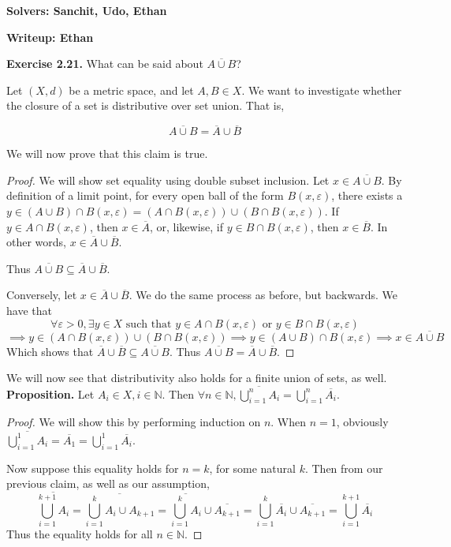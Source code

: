 \documentclass{article}
\newcommand{\cl}[1]{\overline{#1}}
\theoremstyle{plain} %
\numberwithin{thm}{section} %
\theoremstyle{definition}
\begin{document}
	

	
	\noindent\textbf{Solvers: Sanchit, Udo, Ethan}

    \noindent\textbf{Writeup: Ethan}

    \noindent\textbf{Exercise 2.21.} What can be said about $\cl{A\cup B}$?
	
    Let \((X, d)\) be a metric space, and let \(A, B \in X\). We want to investigate whether the closure of a set is distributive over set union. That is,

    \[
        \cl{A\cup B} = \cl{A} \cup \cl{B}
    \]

    We will now prove that this claim is true.

\begin{proof}
	We will show set equality using double subset inclusion. Let \(x \in \cl{A \cup B}\). By definition of a limit point, for every open ball of the form \(B(x, \varepsilon )\), there exists a \(y \in (A \cup B) \cap B(x, \varepsilon ) = (A \cap B(x, \varepsilon )) \cup (B \cap B(x,\varepsilon ))\). If \(y \in A \cap B(x, \varepsilon )\), then \(x \in \cl{A}\), or, likewise, if \(y \in B \cap B(x,\varepsilon )\), then \(x \in \cl{B}\). In other words, \(x \in \cl{A} \cup \cl{B}\).

    Thus \(\cl{A\cup B} \subseteq \cl{A} \cup \cl{B}\).

    \noindent Conversely, let \(x \in \cl{A} \cup \cl{B} \). We do the same process as before, but backwards. We have that
    \[
        \forall \varepsilon > 0, \exists y \in X \text{ such that } y \in A \cap B(x, \varepsilon ) \text{ or } y \in B \cap B(x, \varepsilon )
    \]
    \[
        \implies y \in (A \cap B(x, \varepsilon )) \cup (B \cap B(x, \varepsilon )) \implies y \in (A \cup B) \cap B(x, \varepsilon ) \implies x \in \cl{A \cup B}
    \]
    Which shows that \(\cl{A} \cup \cl{B} \subseteq \cl{A \cup B}\). Thus \(\cl{A\cup B} = \cl{A} \cup \cl{B}\).

\end{proof}
	We will now see that distributivity also holds for a finite union of sets, as well. \\

    \noindent\textbf{Proposition.} Let \(A_i \in X, i \in \mathbb{N} \). Then \(\forall n \in \mathbb{N} , \cl{\bigcup_{i=1}^n A_i} = \bigcup_{i=1}^{n} \cl{A_i}\).
    \begin{proof}
        We will show this by performing induction on \(n\). When \(n = 1\), obviously \(\cl{\bigcup_{i=1}^1 A_i} = \cl{A_1} = \bigcup_{i=1}^{1} \cl{A_i}\).

        Now suppose this equality holds for \(n = k\), for some natural \(k\). Then from our previous claim, as well as our assumption,
        \[
            \cl{\bigcup_{i=1}^{k+1} A_i} = \cl{\bigcup_{i=1}^{k} A_i \cup A_{k+1} } = \cl{\bigcup_{i=1}^{k} A_i} \cup \cl{A_{k+1} } = \bigcup_{i=1}^{k} \cl{A_i} \cup \cl{A_{k+1} } = 
            \bigcup_{i=1}^{k+1} \cl{A_i}
        \]
        Thus the equality holds for all \(n \in \mathbb{N} \).

    \end{proof}
\end{document}
